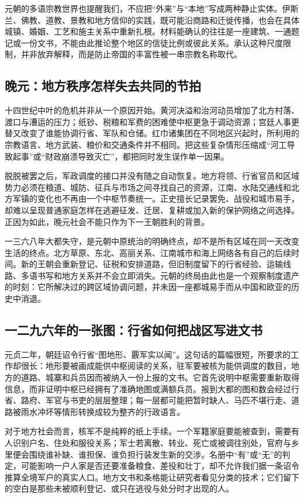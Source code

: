 元朝的多语宗教世界也提醒我们，不应把“外来”与“本地”写成两种静止实体。伊斯兰、佛教、道教、景教和地方信仰的实践，既可能沿商路和迁徙传播，也会在具体城镇、婚姻、工艺和施主关系中重新扎根。材料能确认的往往是一座建筑、一通题记或一份文书，不能由此推论整个地区的信徒比例或彼此关系。承认这种尺度限制，并非放弃解释，而是防止帝国的丰富性被一串宗教名称取代。

\subsection{晚元：地方秩序怎样失去共同的节拍}

十四世纪中叶的危机并非从一个原因开始。黄河决溢和治河动员增加了北方村落、渡口与漕运的压力；纸钞、税粮和军费的困难使中枢更急于调动资源；宫廷人事更替又改变了谁能协调行省、军队和仓储。红巾诸集团在不同地区兴起时，所利用的宗教语言、地方武装、粮价和交通条件并不相同。把这些复杂情形压缩成“河工导致起事”或“财政崩溃导致灭亡”，都把同时发生误作单一因果。

脱脱被罢之后，军政调度的接口并没有随之自动恢复。地方将领、行省官员和区域势力必须在粮道、城防、征兵与市场之间寻找自己的资源，江南、水陆交通线和北方军镇的变化也不再由一个中枢节奏统一。正史擅长记录罢免、战役和城市易手，却难以呈现普通家庭怎样在逃避征发、迁居、复耕或加入新的保护网络之间选择。正因为如此，晚元社会不能只作为下一王朝胜利的背景。

一三六八年大都失守，是元朝中原统治的明确终点，却不是所有区域在同一天改变生活的终点。北方草原、东北、高丽关系、江南城市和海上网络各有自己的后续时间。新的王朝会重新登记、征税和安排道路，但旧制度留下的行省经验、运输线路、多语书写和地方关系并不会立即消失。元朝的终局由此也是一个观察制度遗产的时刻：它所解决过的跨区域协调问题，并未因一座都城易手而从中国和欧亚的历史中消退。

\subsection{一二九六年的一张图：行省如何把战区写进文书}

元贞二年，朝廷诏令行省“图地形、覈军实以闻”。这句话的篇幅很短，所要求的工作却很长：地形要被画成能供中枢阅读的关系，驻军要被核为能供调度的数目，地方的道路、城寨和兵员因而被纳入一份上报的文书。它首先说明中枢需要重新取得信息，而非证明中枢已经拥有了准确地图或满额兵员。报到大都的图和数会经过行省、路府、军官与书吏的层层整理；每一层都可能把暂时缺人、马匹不堪行走、道路被雨水冲坏等情形转换成较为整齐的行政语言。

对于地方社会而言，核军不是纯粹的纸上手续。一个军籍家庭要能被查到，需要有人识别户名、住处和服役关系；军士若离散、转业、死亡或被调往别处，官府与乡里便会围绕谁补缺、谁担保、谁负担行装发生新的交涉。名册中“有”或“无”的判定，可能影响一户人家是否还要准备粮食、差役和壮丁，却不允许我们据一条诏令推算全境军户的真实人口。地方文书和条格能让研究者看见分类的技术；它们留下的空白是那些未被顺利登记、或只在逃役与处分时才出现的人。

